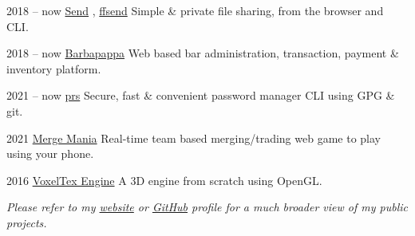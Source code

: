 \documentclass[]{cv-timvisee}
\begin{document}
\begin{entrylist}

\entry
{2018 -- now}
{\href{https://github.com/timvisee/send}{Send} , \href{https://github.com/timvisee/ffsend}{ffsend}}
{}
{Simple \& private file sharing, from the browser and CLI.}

\entry
{2018 -- now}
{\href{https://github.com/timvisee/barbapappa}{Barbapappa}}
{}
{Web based bar administration, transaction, payment \& inventory platform.}

\entry
{2021 -- now}
{\href{https://github.com/timvisee/prs}{prs}}
{}
{Secure, fast \& convenient password manager CLI using GPG \& git.}

\entry
{2021}
{\href{https://github.com/timvisee/merge-mania}{Merge Mania}}
{}
{Real-time team based merging/trading web game to play using your phone.}





\entry
{2016}
{\href{https://github.com/timvisee/voxeltex-engine}{VoxelTex Engine}}
{}
{A 3D engine from scratch using OpenGL.}


\end{entrylist}

\emph{Please refer to my
\href{https://timvisee.com/projects}{website} or
\href{https://github.com/timvisee}{GitHub}
profile for a much broader view of my public projects.}

\end{document}

